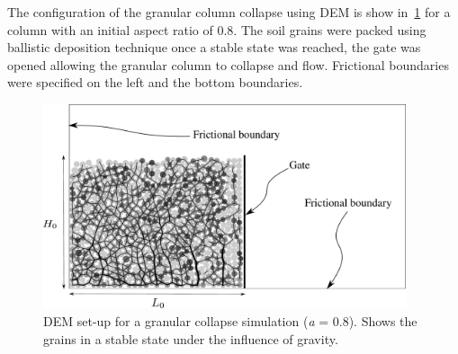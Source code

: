 The configuration of the granular column collapse using DEM is show 
in~\cref{fig:DEM_Column_Sample} for a column with an initial aspect ratio of 
0.8. The soil grains were packed using ballistic deposition technique once a 
stable state was reached, the gate was opened allowing the granular column to 
collapse and flow. Frictional boundaries were specified on the left and 
the bottom boundaries.

\begin{figure}
\centering
\includegraphics[width=0.95\textwidth]{DEM_Column_Sample}
\caption[DEM set-up of a granular collapse simulation (\textit{a} = 0.8).]{DEM 
set-up for a granular collapse simulation (\textit{a} = 0.8). 
Shows the grains in a stable state under the influence of gravity.}
\label{fig:DEM_Column_Sample}
\end{figure}

